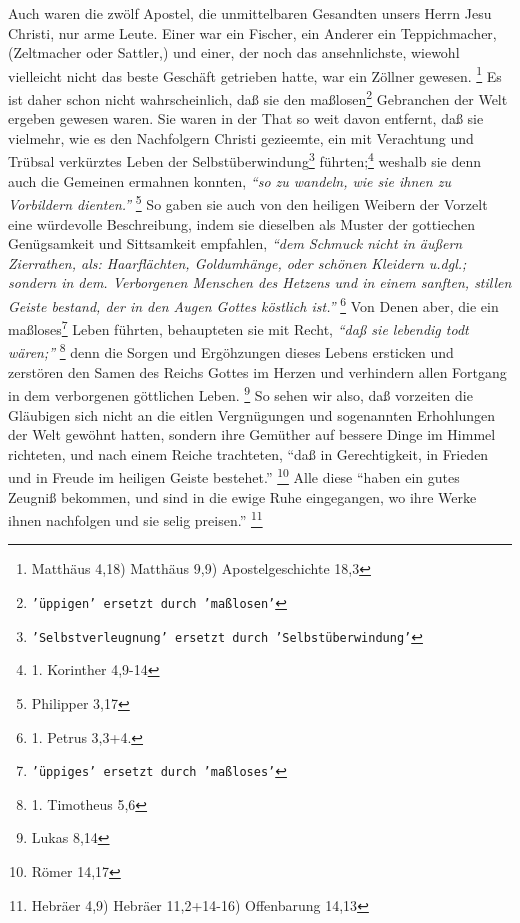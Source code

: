 Auch waren die zwölf Apostel, die unmittelbaren Gesandten unsers Herrn Jesu
Christi, nur arme Leute. Einer war ein Fischer, ein Anderer ein Teppichmacher,
(Zeltmacher oder Sattler,) und einer, der noch das ansehnlichste, wiewohl
vielleicht nicht das beste Geschäft getrieben hatte, war ein Zöllner
gewesen.
\footnote{Matthäus 4,18) Matthäus 9,9) Apostelgeschichte 18,3}
Es ist daher
schon nicht wahrscheinlich, daß sie den maßlosen\footnote{\texttt{'üppigen' ersetzt durch 'maßlosen'}} Gebranchen der Welt ergeben
gewesen waren. Sie waren in der That so weit davon entfernt, daß sie vielmehr,
wie es den Nachfolgern Christi gezieemte, ein mit Verachtung und Trübsal
verkürztes Leben der Selbstüberwindung\footnote{\texttt{'Selbstverleugnung' ersetzt durch 'Selbstüberwindung'}} führten;\footnote{1. Korinther 4,9-14}
weshalb
sie denn auch die Gemeinen ermahnen konnten,
\textit{"`so zu wandeln, wie sie ihnen zu
Vorbildern dienten."'}
\footnote{Philipper 3,17}
So gaben sie auch von den heiligen
Weibern der Vorzelt eine würdevolle Beschreibung, indem sie dieselben als Muster
der gottiechen Genügsamkeit und Sittsamkeit empfahlen,
\textit{"`dem Schmuck nicht in
äußern Zierrathen, als: Haarflächten, Goldumhänge, oder schönen Kleidern u.dgl.;
sondern in dem. Verborgenen Menschen des Hetzens und in einem sanften, stillen
Geiste bestand, der in den Augen Gottes köstlich ist."'}
\footnote{1. Petrus 3,3+4.}
Von Denen aber, die ein maßloses\footnote{\texttt{'üppiges' ersetzt durch 'maßloses'}} Leben führten, behaupteten sie mit Recht,
\textit{"`daß sie lebendig todt wären;"'}
\footnote{1. Timotheus 5,6}
denn die Sorgen und
Ergöhzungen dieses Lebens ersticken und zerstören den Samen des Reichs
Gottes im
Herzen und verhindern allen Fortgang in dem verborgenen göttlichen
Leben.
\footnote{Lukas 8,14}
So sehen wir also, daß vorzeiten die Gläubigen sich
nicht an die eitlen Vergnügungen und sogenannten Erhohlungen der Welt gewöhnt
hatten, sondern ihre Gemüther auf bessere Dinge im Himmel richteten, und nach
einem Reiche trachteten,
"`daß in Gerechtigkeit, in Frieden und in Freude im
heiligen Geiste bestehet."'
\footnote{Römer 14,17}
Alle diese
"`haben ein gutes
Zeugniß bekommen, und sind in die ewige Ruhe eingegangen, wo ihre Werke ihnen
nachfolgen und sie selig preisen."'
\footnote{Hebräer 4,9) Hebräer 11,2+14-16)
Offenbarung 14,13}

